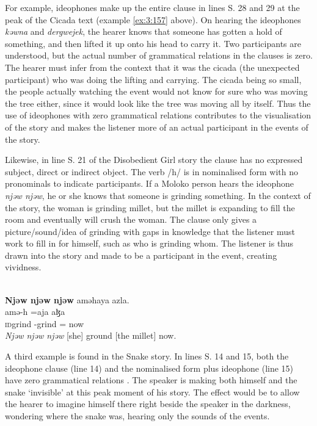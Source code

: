 {For example, ideophones make up the entire clause in lines S. 28 and 29 at the peak of the Cicada text (example  \ref{ex:3:157} above). On hearing the ideophones \textit{kəwna} and \textit{dergwejek}, the hearer knows that someone has gotten a hold of something, and then lifted it up onto his head to carry it. Two participants are understood, but the actual number of grammatical relations in the clauses is zero. The hearer must infer from the context that it was the cicada (the unexpected participant) who was doing the lifting and carrying. The cicada being so small, the people actually watching the event would not know for sure who was moving the tree either, since it would look like the tree was moving all by itself. Thus the use of ideophones with zero grammatical relations contributes to the visualisation of the story and makes the listener more of an actual participant in the events of the story. 

Likewise, in line S. 21 of the Disobedient Girl story  the clause has no expressed subject, direct or indirect object. The verb /h/ is in nominalised form with no pronominals to indicate participants. If a Moloko person hears the ideophone \textit{njəw njəw}, he or she knows that someone is grinding something. In the context of the story, the woman is grinding millet, but the millet is expanding to fill the room and eventually will crush the woman. The clause only gives a picture/sound/idea of grinding with gaps in knowledge that the listener must work to fill in for himself, such as who is grinding whom. The listener is thus drawn into the story and made to be a participant in the event, creating vividness.


\ea \label{ex:3:159}\\
\textbf{Njəw  njəw  njəw}  aməhaya  azla.\\
           amə-h    =aja     aɮa\\
      \textsc{id}grind             {\DEP}-grind  ={\PLU}    now\\
\glt  \textit{Njəw  njəw  njəw} [she] ground [the millet] now. 
\z

A third example is found in the Snake story. In lines S. 14 and 15, both the ideophone clause (line 14) and the nominalised form plus ideophone (line 15) have zero grammatical relations . The speaker is making both himself and the snake ‘invisible’ at this peak moment of his story. The effect would be to allow the hearer to imagine himself there right beside the speaker in the darkness, wondering where the snake was, hearing only the sounds of the events. 

}
